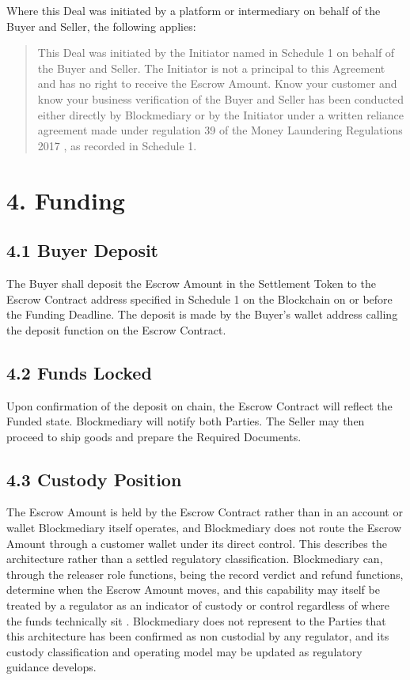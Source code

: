 \documentclass[12pt, a4paper]{article}
\begin{document}
Where this Deal was initiated by a platform or intermediary on behalf of the Buyer and
Seller, the following applies:

\begin{quote}
This Deal was initiated by the Initiator named in Schedule 1 on behalf of the Buyer and
Seller. The Initiator is not a principal to this Agreement and has no right to receive the
Escrow Amount. Know your customer and know your business verification of the Buyer and
Seller has been conducted either directly by Blockmediary or by the Initiator under a
written reliance agreement made under regulation 39 of the Money Laundering Regulations
2017 \citep{mlr2017}, as recorded in Schedule 1.
\end{quote}

\section*{4. Funding}

\subsection*{4.1 Buyer Deposit}

The Buyer shall deposit the Escrow Amount in the Settlement Token to the Escrow Contract
address specified in Schedule 1 on the Blockchain on or before the Funding Deadline. The
deposit is made by the Buyer's wallet address calling the deposit function on the Escrow
Contract.

\subsection*{4.2 Funds Locked}

Upon confirmation of the deposit on chain, the Escrow Contract will reflect the Funded
state. Blockmediary will notify both Parties. The Seller may then proceed to ship goods
and prepare the Required Documents.

\subsection*{4.3 Custody Position}

The Escrow Amount is held by the Escrow Contract rather than in an account or wallet
Blockmediary itself operates, and Blockmediary does not route the Escrow Amount through a
customer wallet under its direct control. This describes the architecture rather than a
settled regulatory classification. Blockmediary can, through the releaser role functions,
being the record verdict and refund functions, determine when the Escrow Amount moves, and
this capability may itself be treated by a regulator as an indicator of custody or control
regardless of where the funds technically sit \citep{difcvarareport2026}. Blockmediary does
not represent to the Parties that this architecture has been confirmed as non custodial by
any regulator, and its custody classification and operating model may be updated as
regulatory guidance develops.
\end{document}
